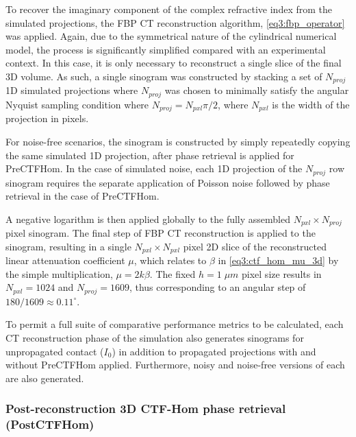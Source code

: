 \documentclass[twocolumn, switch]{article} %
\begin{document}
To recover the imaginary component of the complex refractive index from the simulated projections, the FBP CT reconstruction algorithm, \cref{eq3:fbp_operator} was applied. Again, due to the symmetrical nature of the cylindrical numerical model, the process is significantly simplified compared with an experimental context. In this case, it is only necessary to reconstruct a single slice of the final 3D volume. As such, a single sinogram was constructed by stacking a set of ${N_{proj}}$ 1D simulated projections where ${N_{proj}}$ was chosen to minimally satisfy the angular Nyquist sampling condition \cite{Hsieh2015ComputedAdvances} where ${N_{proj}} = {N_{pxl}} \pi / 2$, where ${N_{pxl}}$ is the width of the projection in pixels.  

For noise-free scenarios, the sinogram is constructed by simply repeatedly copying the same simulated 1D projection, after phase retrieval is applied for PreCTFHom. In the case of simulated noise, each 1D projection of the ${N_{proj}}$ row sinogram requires the separate application of Poisson noise followed by phase retrieval in the case of PreCTFHom.

A negative logarithm is then applied globally to the fully assembled ${N_{pxl}} \times {N_{proj}}$ pixel sinogram. The final step of FBP CT reconstruction is applied to the sinogram, resulting in  a single ${N_{pxl}} \times {N_{pxl}}$ pixel 2D slice of the reconstructed linear attenuation coefficient $\mu$, which relates to $\beta$ in \cref{eq3:ctf_hom_mu_3d} by the simple multiplication, $\mu=2k \beta $. The fixed $h=1\;\mu m$ pixel size results in ${N_{pxl}} = 1024$ and ${N_{proj}} = 1609$, thus corresponding to an angular step of $180/1609 \approx 0.11^{\circ }$.

To permit a full suite of comparative performance metrics to be calculated, each CT reconstruction phase of the simulation also generates sinograms for unpropagated contact ($I_0$) in addition to propagated projections with and without PreCTFHom applied. Furthermore, noisy and noise-free versions of each are also generated.

\subsubsection{Post-reconstruction 3D CTF-Hom phase retrieval (PostCTFHom)}
\end{document}
